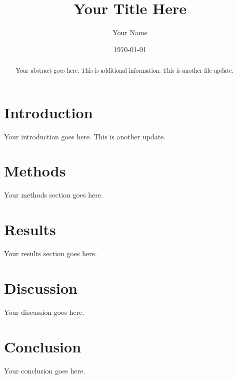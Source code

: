 \documentclass{article}
\title{Your Title Here}
\author{Your Name}
\date{\today}
\begin{document}
\maketitle

\begin{abstract}
Your abstract goes here. This is additional information. This is another file update.
\end{abstract}

\section{Introduction}
Your introduction goes here.
This is another update.

\section{Methods}
Your methods section goes here.

\section{Results}
Your results section goes here.

\section{Discussion}
Your discussion goes here.

\section{Conclusion}
Your conclusion goes here.



\end{document}
